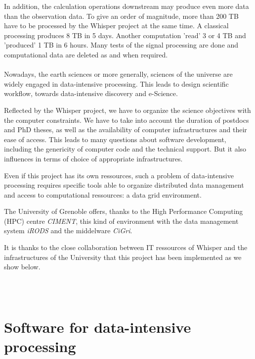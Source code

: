 \documentclass[a4paper, 10pt]{article}
\begin{document}
\begin{multicols}{2}
In addition, the calculation operations downstream may produce even more data than the observation data.
To give an order of magnitude, more than 200 TB have to be processed by the Whisper project at the same time. 
A classical processing produces 8 TB in 5 days. Another computation 'read' 3 or 4 TB and 'produced' 1 TB in 6 hours.
Many tests of the signal processing are done and computational data are deleted as and when required.
~\\ \\

\vspace{0.18cm}
Nowadays, the earth sciences or more generally, sciences of the universe are widely engaged in
data-intensive processing. This leads to design scientific workflow, towards data-intensive discovery and e-Science.
\vspace{-0.04cm}

Reflected by the Whisper project, we have to organize the science objectives with
the computer constraints. We have to take into account 
the duration of postdocs and PhD theses, as well as the availability of computer infrastructures and their ease of access. 
This leads to many questions about software development, including the genericity of computer code and 
the technical support. But it also influences in terms of choice of appropriate infrastructures.

Even if this project has its own ressources, such a problem of data-intensive processing requires specific tools able to 
organize distributed data management and access to computational ressources: a data grid environment.
\vspace{-0.04cm}

The University of Grenoble offers, thanks to the High Performance Computing (HPC) centre \emph{CIMENT}, this kind of environment with the data management system \emph{iRODS}
and the middelware \emph{CiGri}.%
\vspace{-0.04cm}

It is thanks to the close collaboration between IT ressources of Whisper and the infrastructures of the University
that this project has been implemented as we show below.

~\\ \\


\section{Software for data-intensive processing} \label{Section_Software_for_data-intensive_processing} %



\end{multicols}
\end{document}
